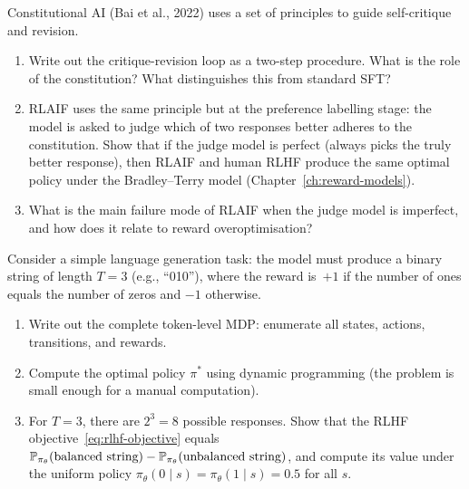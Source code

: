 \begin{exercise}
\label{ex:constitutional-ai}
Constitutional AI (Bai et al., 2022) uses a set of principles to guide self-critique and revision.
\begin{enumerate}
  \item Write out the critique-revision loop as a two-step procedure. What is the role of the constitution? What distinguishes this from standard SFT?
  \item RLAIF uses the same principle but at the preference labelling stage: the model is asked to judge which of two responses better adheres to the constitution. Show that if the judge model is perfect (always picks the truly better response), then RLAIF and human RLHF produce the same optimal policy under the Bradley--Terry model (Chapter~\ref{ch:reward-models}).
  \item What is the main failure mode of RLAIF when the judge model is imperfect, and how does it relate to reward overoptimisation?
\end{enumerate}
\end{exercise}

\begin{exercise}
\label{ex:mdp-mapping}
Consider a simple language generation task: the model must produce a binary string of length $T = 3$ (e.g., ``010''), where the reward is~$+1$ if the number of ones equals the number of zeros and $-1$ otherwise.
\begin{enumerate}
  \item Write out the complete token-level MDP: enumerate all states, actions, transitions, and rewards.
  \item Compute the optimal policy $\pi^*$ using dynamic programming (the problem is small enough for a manual computation).
  \item For $T = 3$, there are $2^3 = 8$ possible responses. Show that the RLHF objective~\eqref{eq:rlhf-objective} equals $\mathbb{P}_{\pi_\theta}(\text{balanced string}) - \mathbb{P}_{\pi_\theta}(\text{unbalanced string})$, and compute its value under the uniform policy $\pi_\theta(0 \mid s) = \pi_\theta(1 \mid s) = 0.5$ for all $s$.
\end{enumerate}
\end{exercise}
